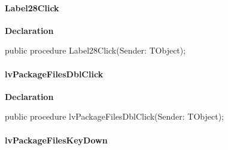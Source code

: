 \documentclass{report}
\newif\ifpdf
\begin{document}
\paragraph*{Label28Click}\hspace*{\fill}

\label{prjwizard.TfrmProjectWizard-Label28Click}
\begin{list}{}{
\setlength{\itemindent}{0cm}
\setlength{\listparindent}{0cm}
\setlength{\leftmargin}{\evensidemargin}
\addtolength{\leftmargin}{\tmplength}
\settowidth{\labelsep}{X}
\addtolength{\leftmargin}{\labelsep}
\setlength{\labelwidth}{\tmplength}
}
\item[\textbf{Declaration}\hfill]
\ifpdf
\begin{flushleft}
\fi
\begin{ttfamily}
public procedure Label28Click(Sender: TObject);\end{ttfamily}

\ifpdf
\end{flushleft}
\fi

\end{list}
\paragraph*{lvPackageFilesDblClick}\hspace*{\fill}

\label{prjwizard.TfrmProjectWizard-lvPackageFilesDblClick}
\begin{list}{}{
\setlength{\itemindent}{0cm}
\setlength{\listparindent}{0cm}
\setlength{\leftmargin}{\evensidemargin}
\addtolength{\leftmargin}{\tmplength}
\settowidth{\labelsep}{X}
\addtolength{\leftmargin}{\labelsep}
\setlength{\labelwidth}{\tmplength}
}
\item[\textbf{Declaration}\hfill]
\ifpdf
\begin{flushleft}
\fi
\begin{ttfamily}
public procedure lvPackageFilesDblClick(Sender: TObject);\end{ttfamily}

\ifpdf
\end{flushleft}
\fi

\end{list}
\paragraph*{lvPackageFilesKeyDown}\hspace*{\fill}
\end{document}
